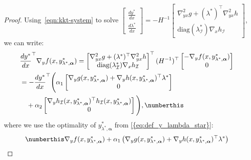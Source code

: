 \begin{proof}
Using~\cref{eqn:kkt-system} to solve $\begin{bmatrix}
    \frac{d y^*}{d x} \\
    \frac{d \lambda^*}{d x}
\end{bmatrix} = -H^{-1} \begin{bmatrix}
    \nabla^2_{yx} g + (\lambda^*)^\top \nabla_{yx}^2 h \\
    \text{diag}(\lambda^*_\mathcal{I}) \nabla_x h_\mathcal{I}
\end{bmatrix}$, 
we can write:
\begin{align*}
    & \frac{d y^*}{d x}^\top \nabla_y f(x,y_{\lambda^*,\boldsymbol{\alpha}}^*) =  \begin{bmatrix}
        \nabla^2_{yx} g + (\lambda^*)^\top \nabla_{yx}^2 h \\
        \text{diag}(\lambda^*_\mathcal{I}) \nabla_x h_\mathcal{I}
    \end{bmatrix}^\top (H^{-1})^\top \begin{bmatrix}
        - \nabla_y f(x,y_{\lambda^*,\boldsymbol{\alpha}}^*) \\ 0
    \end{bmatrix}   \\
     &= -\frac{d y^*}{d x}^\top  \Biggl( \alpha_1 \begin{bmatrix}
        \nabla_y g(x,y_{\lambda^*,\boldsymbol{\alpha}}^*) + \nabla_y h(x,y_{\lambda^*,\boldsymbol{\alpha}}^*)^\top \lambda^* \\
        0
    \end{bmatrix} \\ 
    &\quad + 
    \alpha_2 \begin{bmatrix}
         \nabla_y h_\mathcal{I}(x,y_{\lambda^*,\boldsymbol{\alpha}}^*)^\top h_\mathcal{I}(x,y_{\lambda^*,\boldsymbol{\alpha}}^*) \\
        0
    \end{bmatrix}
    \Biggl), \numberthis\label{eqn:dfdy_dydx_expansion}
\end{align*}
where we use the optimality of $y_{\lambda^*,\boldsymbol{\alpha}}^*$ from \cref{{eq:def_y_lambda_star}}:
\begin{align*}\numberthis\label{eqn:y_lambda_star_optimality}
    & \nabla_y f(x,y_{\lambda^*,\boldsymbol{\alpha}}^*) + \alpha_1 \left( \nabla_y g(x,y_{\lambda^*,\boldsymbol{\alpha}}^*) + \nabla_y h(x,y_{\lambda^*,\boldsymbol{\alpha}}^*)^\top \lambda^* \right) \\

\end{align*}
\end{proof}
